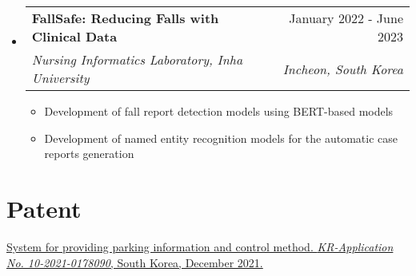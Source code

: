 \documentclass[letterpaper,11pt]{article}
\makeatletter
\newcommand{\resumeSubheading}[4]{
  \vspace{-1pt}\item
    \begin{tabular*}{0.97\textwidth}{l@{\extracolsep{\fill}}r}
      #1 & #2 \\
      \textit{\small#3} & \textit{\small #4} \\
    \end{tabular*}\vspace{-5pt}
}
\makeatother
\begin{document}
\begin{itemize}[leftmargin=*,label=]
        \resumeSubheading
        {\textbf{FallSafe: Reducing Falls with Clinical Data}}{January 2022 - June 2023}
            {Nursing Informatics Laboratory, Inha University}{Incheon, South Korea}
            \begin{itemize}[label=\bullet]
                \item{Development of fall report detection models using BERT-based models}
                \item{Development of named entity recognition models for the automatic case reports generation}
            \end{itemize}
    \end{itemize}


    \section{Patent}
    \begin{enumerate}[noitemsep, leftmargin=*,label={[\arabic*]}]
        \item{\href{https://doi.org/10.8080/1020210178090}{System for providing parking information and control method. \textit{KR-Application No. 10-2021-0178090}, South Korea, December 2021.}}
    \end{enumerate}
\end{document}
